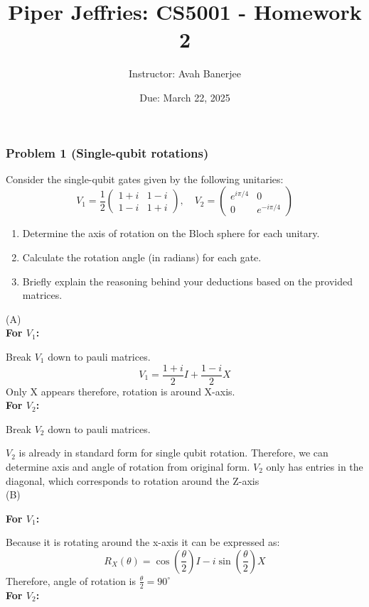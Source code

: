 \documentclass[12pt]{article}
\title{Piper Jeffries: CS5001 - Homework 2}
\author{Instructor: Avah Banerjee}
\date{Due: March 22, 2025}
\begin{document}

\maketitle

\subsubsection*{Problem 1 (Single-qubit rotations)}
Consider the single-qubit gates given by the following unitaries:
\[
    V_1 = \frac{1}{2} 
    \begin{pmatrix} 
    1 + i & 1 - i \\ 
    1 - i & 1 + i 
    \end{pmatrix}, 
    \quad
    V_2 = 
    \begin{pmatrix} 
    e^{i\pi/4} & 0 \\ 
    0 & e^{-i\pi/4} 
    \end{pmatrix}
\]
\begin{enumerate}
    \renewcommand{\labelenumi}{\Alph{enumi}.}
    \item Determine the axis of rotation on the Bloch sphere for each unitary.
    \item Calculate the rotation angle (in radians) for each gate.
    \item Briefly explain the reasoning behind your deductions based on the provided matrices.
\end{enumerate}
(A)
\\
\textbf{For $V_1$:}

    Break $V_1$ down to pauli matrices.
\[
V_1 = \frac{1+i}{2}I + \frac{1-i}{2}X
\]
Only X appears therefore, rotation is around X-axis.
\\
\textbf{For $V_2$:}

Break $V_2$ down to pauli matrices.

$V_2$ is already in standard form for single qubit rotation. Therefore, we can determine axis and angle of rotation from original form.
$V_2$ only has entries in the diagonal, which corresponds to rotation around the Z-axis
\\
(B)

\textbf{For $V_1$:}

Because it is rotating around the x-axis it can be expressed as:
\[
    R_{X}(\theta) = \cos(\frac{\theta}{2})I - i\sin (\frac{\theta}{2})X
\]
Therefore, angle of rotation is $\frac{\theta}{2} = 90^\circ $ 
\\
\textbf{For $V_2$:}
\end{document}
